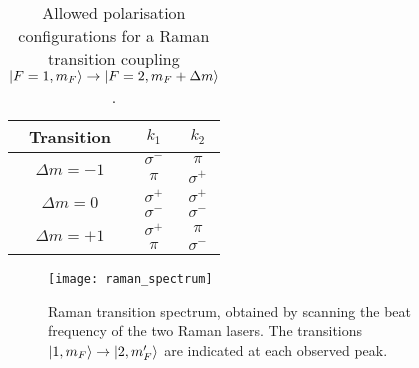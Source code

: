 \begin{table}
  \centering
  \begin{tabular}{ccc}
    \toprule
    Transition & $k_1$ & $k_2$ \\
    \midrule 
    \multirow{2}{*}{$\Delta m  = -1 $} & $\sigma^-$ & $\pi$ \\
    \cmidrule{2-3}
     & $\pi$ & $\sigma^+$\\
    \midrule
    \multirow{2}{*}{$\Delta m = 0$} & $\sigma^+$ & $\sigma^+$ \\
    \cmidrule{2-3}
     & $\sigma^-$ & $\sigma^-$\\
    \midrule
    \multirow{2}{*}{$\Delta m = +1$} & $\sigma^+$ & $\pi$ \\
    \cmidrule{2-3}
     & $\pi$ & $\sigma^-$\\
    \bottomrule
  \end{tabular}
  \caption{Allowed polarisation configurations for a Raman transition
  coupling $\ket{F=1, m_F} \rightarrow \ket{F=2, m_F+\Delta m}$.} 
  \label{tab:raman_polarisation}
\end{table}
\begin{figure}[htpb]
  \centering
  \texttt{[image: raman\_spectrum]}
  \caption[Raman transition spectrum]{Raman transition spectrum, obtained by scanning the beat
    frequency of the two Raman lasers. The transitions \(\ket{1,m_F}
  \rightarrow \ket{2,m_F'}\) are indicated at each observed peak.}
  \label{fig:raman_spectrum}
\end{figure}

